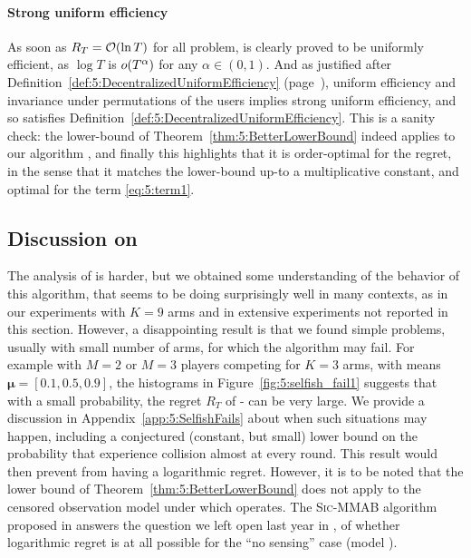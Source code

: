 \paragraph{Strong uniform efficiency}\label{app:5:JustifyingDefinition5}
%
As soon as $R_T = \mathop{}\mathopen{}\mathcal{O}\mathopen{}\left(\ln T\right)$ for all problem, \MCTopM{} is clearly proved
to be uniformly efficient, as $\log T$ is $\mathop{}\mathopen{}o\mathopen{}\left(T^{\alpha}\right)$ for any $\alpha\in(0,1)$.
%
And as justified after Definition~\ref{def:5:DecentralizedUniformEfficiency} (page~\pageref{def:5:DecentralizedUniformEfficiency}), uniform efficiency and invariance under permutations of the users implies strong uniform efficiency, and so \MCTopM{} satisfies Definition~\ref{def:5:DecentralizedUniformEfficiency}.
%
This is a sanity check: the lower-bound of
Theorem~\ref{thm:5:BetterLowerBound} indeed applies to our algorithm \MCTopM,
and finally this highlights that it is order-optimal for the regret, in the sense that it matches the lower-bound up-to a multiplicative constant,
and optimal for the term \ref{eq:5:term1}.


\subsection{Discussion on \Selfish} \label{sub:5:SelfishFails}

The analysis of \Selfish{} is harder, but we obtained some understanding of the behavior of this algorithm, that seems to be doing surprisingly well in many contexts, as in our experiments with $K=9$ arms and in extensive experiments not reported in this section. However, a disappointing result is that we found simple problems, usually with small number of arms, for which the algorithm may fail. For example with $M=2$ or $M=3$ players competing for $K=3$ arms,
with means $\boldsymbol{\mu} = [0.1, 0.5, 0.9]$, the histograms in Figure~\ref{fig:5:selfish_fail1} suggests that with a small probability, the regret $R_T$ of \Selfish-\klUCB{} can be very large. We provide a discussion in Appendix~\ref{app:5:SelfishFails} about when such situations may happen, including a conjectured (constant, but small) lower bound on the probability that \Selfish{} experience collision almost at every round. This result would then prevent \Selfish{} from having a logarithmic regret. However, it is to be noted that the lower bound of Theorem~\ref{thm:5:BetterLowerBound} does not apply to the censored observation model \modeltrois{} under which \Selfish{} operates.
%
The \textsc{Sic-MMAB} algorithm proposed in \cite{BoursierPerchet18} answers the question we left open last year in \cite{Besson2018ALT},
of whether logarithmic regret is at all possible for the ``no sensing'' case (model \modeltrois).



